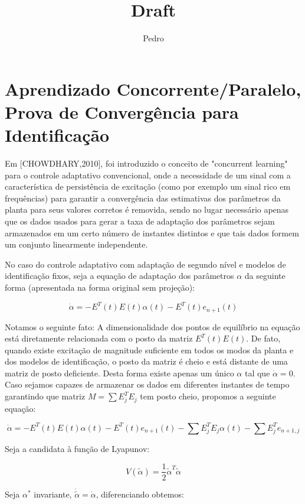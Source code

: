 \documentclass[11pt]{report}
\title{Draft}
\author{Pedro}
\begin{document}
\section{Aprendizado Concorrente/Paralelo, Prova de Convergência para Identificação}

Em [CHOWDHARY,2010], foi introduzido o conceito de "concurrent learning" para o controle adaptativo convencional, onde a necessidade de um sinal com a característica de persistência de excitação (como por exemplo um sinal rico em frequências) para garantir a convergência das estimativas dos parâmetros da planta para seus valores corretos é removida, sendo no lugar necessário apenas que os dados usados para gerar a taxa de adaptação dos parâmetros sejam armazenados em um certo número de instantes distintos e que tais dados formem um conjunto linearmente independente.

No caso do controle adaptativo com adaptação de segundo nível e modelos de identificação fixos, seja a equação de adaptação dos parâmetros $\alpha$ da seguinte forma (apresentada na forma original sem projeção):

\begin{equation}
\dot{\alpha} = -E^T(t)E(t)\alpha(t) - E^T(t)e_{n+1}(t)
\end{equation}

Notamos o seguinte fato: A dimensionalidade dos pontos de equilíbrio na equação está diretamente relacionada com o posto da matriz $E^T(t)E(t)$. De fato, quando existe excitação de magnitude suficiente em todos os modos da planta e dos modelos de identificação, o posto da matriz é cheio e está distante de uma matriz de posto deficiente. Desta forma existe apenas um único $\alpha$ tal que $\dot{\alpha}=0$. Caso sejamos capazes de armazenar os dados em diferentes instantes de tempo garantindo que matriz $M = \sum E_j^TE_j$ tem posto cheio, propomos a seguinte equação:

\begin{equation}
\dot{\alpha} = -E^T(t)E(t)\alpha(t) - E^T(t)e_{n+1}(t) -\sum E_j^TE_j\alpha(t) -\sum E_j^Te_{n+1,j}
\end{equation}

Seja a candidata à função de Lyapunov:

\begin{equation}
V(\tilde{\alpha}) = \frac{1}{2}\tilde{\alpha}^T\tilde{\alpha} 
\end{equation}

Seja $\alpha^*$ invariante, $\dot{\tilde{\alpha}} = \dot{\alpha}$, diferenciando obtemos:
\end{document}
